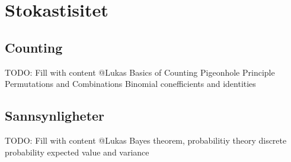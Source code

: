 \section{Stokastisitet}
\subsection{Counting}
\begin{frame}
TODO: Fill with content @Lukas 
Basics of Counting
Pigeonhole Principle
Permutations and Combinations
Binomial conefficients and identities
\end{frame}

\subsection{Sannsynligheter}
\begin{frame}
TODO: Fill with content @Lukas 
Bayes theorem, probabilitiy theory
discrete probability
expected value and variance
\end{frame}


